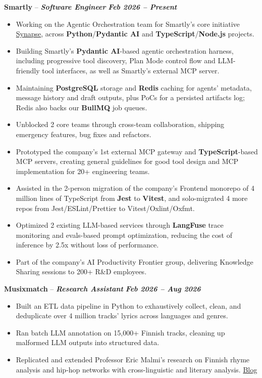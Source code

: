 \documentclass[11pt,a4paper]{article}
\newcommand{\experienceheader}[3]{%
    \Needspace{7\baselineskip}%
    \noindent\textbf{#1} -- \textbf{\textit{#2}} \hfill \textbf{\textit{#3}}%
}
\begin{document}
\experienceheader{Smartly}{Software Engineer}{Feb 2026 -- Present}
\begin{itemize}
    \item Working on the Agentic Orchestration team for Smartly's core initiative \href{https://www.smartly.io/product/synapse}{Synapse}, across \textbf{Python}/\allowbreak\textbf{Pydantic AI} and \textbf{TypeScript}/\allowbreak\textbf{Node.js} projects.
    \item Building Smartly's \textbf{Pydantic AI}-based agentic orchestration harness, including progressive tool discovery, Plan Mode control flow and LLM-friendly tool interfaces, as well as Smartly's external MCP server.
    \item Maintaining \textbf{PostgreSQL} storage and \textbf{Redis} caching for agents' metadata, message history and draft outputs, plus PoCs for a persisted artifacts log; Redis also backs our \textbf{BullMQ} job queues.
    \item Unblocked 2 core teams through cross-team collaboration, shipping emergency features, bug fixes and refactors.
    \item Prototyped the company's 1st external MCP gateway and \textbf{TypeScript}-based MCP servers, creating general guidelines for good tool design and MCP implementation for 20+ engineering teams.
    \item Assisted in the 2-person migration of the company's Frontend monorepo of 4 million lines of TypeScript from \textbf{Jest} to \textbf{Vitest}, and solo-migrated 4 more repos from Jest/ESLint/Prettier to Vitest/Oxlint/Oxfmt.
    \item Optimized 2 existing LLM-based services through \textbf{LangFuse} trace monitoring and evals-based prompt optimization, reducing the cost of inference by 2.5x without loss of performance.
    \item Part of the company's AI Productivity Frontier group, delivering Knowledge Sharing sessions to 200+ R\&D employees.
\end{itemize}

\vspace{3pt}

\experienceheader{Musixmatch}{Research Assistant}{Feb 2026 -- Aug 2026}
\begin{itemize}
    \item Built an ETL data pipeline in Python to exhaustively collect, clean, and deduplicate over 4 million tracks' lyrics across languages and genres.
    \item Ran batch LLM annotation on 15,000+ Finnish tracks, cleaning up malformed LLM outputs into structured data.
    \item Replicated and extended Professor Eric Malmi's research on Finnish rhyme analysis and hip-hop networks with cross-linguistic and literary analysis. \href{https://mining4meaning.com/2026/08/21/raplysaattori-ja-kadonneen-teroittimen-arvoitus/}{Blog}
\end{itemize}
\end{document}
